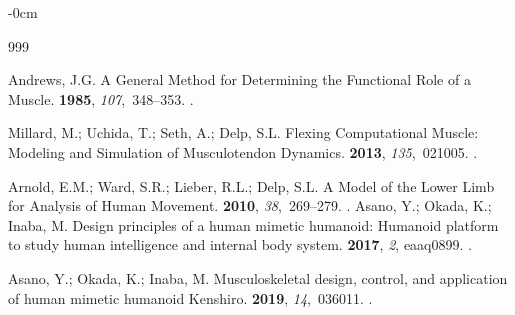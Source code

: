 \documentclass[actuators,article,accept,pdftex,moreauthors]{Definitions/mdpi}
\begin{document}
\begin{adjustwidth}{-\extralength}{0cm}



\begin{thebibliography}{999}

Andrews, J.G.
\newblock A {General} {Method} for {Determining} the {Functional} {Role} of a
  {Muscle}.
 {\bf 1985}, {\em
  107},~348--353.
.

Millard, M.; Uchida, T.; Seth, A.; Delp, S.L.
\newblock Flexing {Computational} {Muscle}: {Modeling} and {Simulation} of
  {Musculotendon} {Dynamics}.
 {\bf 2013}, {\em
  135},~021005.
.

Arnold, E.M.; Ward, S.R.; Lieber, R.L.; Delp, S.L.
\newblock A {Model} of the {Lower} {Limb} for {Analysis} of {Human} {Movement}.
 {\bf 2010}, {\em 38},~269--279.
.
\newpage
{}
Asano, Y.; Okada, K.; Inaba, M.
\newblock Design principles of a human mimetic humanoid: {Humanoid} platform to
  study human intelligence and internal body system.
 {\bf 2017}, {\em 2}, eaaq0899.
.

Asano, Y.; Okada, K.; Inaba, M.
\newblock Musculoskeletal design, control, and application of human mimetic
  humanoid {Kenshiro}.
 {\bf 2019}, {\em 14},~036011.
.


\end{thebibliography}
\end{adjustwidth}
\end{document}
